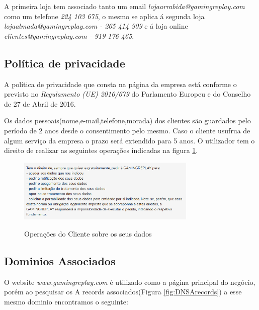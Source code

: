A primeira loja tem associado tanto um email \emph{lojaarrabida@gamingreplay.com} como um telefone \emph{224 103 675}, o mesmo se aplica á segunda loja \emph{lojaalmada@gamingreplay.com - 265 414 909} e á loja online \emph{clientes@gamingreplay.com - 919 176 465}.

\subsection{Política de privacidade}

A política de privacidade que consta na página da empresa está conforme o previsto no \emph{Regulamento (UE) 2016/679} do Parlamento Europeu e do Conselho de 27 de Abril de 2016.

Os dados pessoais(nome,e-mail,telefone,morada) dos clientes são guardados pelo período de 2 anos desde o consentimento pelo mesmo. Caso o cliente usufrua de algum serviço da empresa o prazo será extendido para 5 anos. O utilizador tem o direito de realizar as seguintes operações indicadas na figura \ref{fig:OperCliente}.

\begin{figure}[h!]
\caption{Operações do Cliente sobre os seus dados}
\centering
\includegraphics[width=\textwidth,height=3cm,keepaspectratio]{Images/OperCliente.png}
\label{fig:OperCliente}
\end{figure}

\subsection{Dominios Associados}

O website \emph{www.gamingreplay.com} é utilizado como a página principal do negócio, porém ao pesquisar os A records associados(Figura \ref{fig:DNSArecords}) a esse mesmo dominio encontramos o seguinte:

